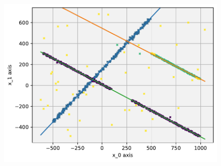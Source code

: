 \begin{figure}[h]
    \vspace{1cm}
    
    \includegraphics[width=.55\textwidth]{figure_method_grid/GlobalLinearCorrelationsWithCorrs.pdf}
    \label{fig:gclusterexample}
\end{figure}








